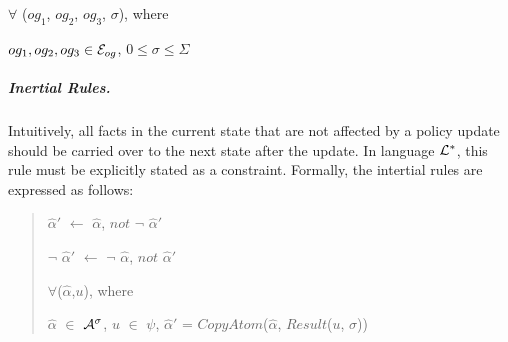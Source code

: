 \documentclass[10pt, twocolumn]{article}
\begin{document}
\begin{enumerate}
                $\forall$ ($og_{1}$, $og_{2}$, $og_{3}$, $\sigma$), where

                $og_{1}, og_{2}, og_{3} \in {\cal E}_{og}$,
                $0 \leq \sigma \leq \Sigma$
            \end{enumerate}

          \subparagraph{Inertial Rules.}

            Intuitively, all facts in the current state that are not affected
            by a policy update should be carried over to the next state after
            the update. In language ${\cal L}^{*}$, this rule must be
            explicitly stated as a constraint. Formally, the intertial rules
            are expressed as follows:

            \begin{quote}
              $\hat{\alpha}'$ $\leftarrow$ $\hat{\alpha}$, $not$ $\lnot$ $\hat{\alpha}'$

              $\lnot$ $\hat{\alpha}'$ $\leftarrow$ $\lnot$ $\hat{\alpha}$, $not$ $\hat{\alpha}'$

              $\forall$($\hat{\alpha}$,$u$), where

              $\hat{\alpha}$ $\in$ ${\cal A}^{\sigma}$,
              $u$ $\in$ $\psi$,
              $\hat{\alpha}'$ = $CopyAtom$($\hat{\alpha}$, $Result$($u$, $\sigma$))
            \end{quote}
\end{document}
